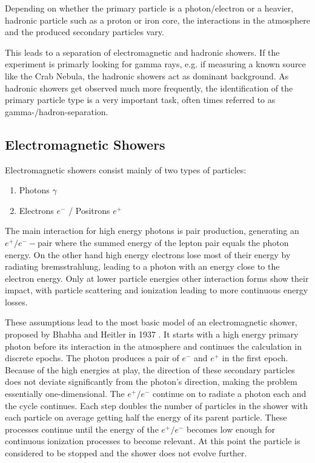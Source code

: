 Depending on whether the primary particle is 
a photon/electron or a heavier, hadronic particle such as a proton 
or iron core, the interactions in the atmosphere and the 
produced secondary particles vary.

This leads to a separation of electromagnetic and hadronic showers.
If the experiment is primarly looking for 
gamma rays, e.g. if measuring a known source like the Crab Nebula, 
the hadronic showers act as dominant background.
As hadronic showers get observed much more frequently, 
the identification of the primary particle type is a very important 
task, often times referred to as gamma-/hadron-separation.

\subsection{Electromagnetic Showers}
Electromagnetic showers consist mainly of two types of particles:
\begin{enumerate}
	\item{Photons $\gamma$}
	\item{Electrons $e^-$ / Positrons $e^+$}
\end{enumerate}

The main interaction for high energy photons is pair 
production, generating an $e^+/e^--$pair where the summed energy of 
the lepton pair equals the photon energy.
On the other hand high energy electrons lose 
most of their energy by radiating bremsstrahlung, leading to a photon with 
an energy close to the electron energy.
Only at lower particle energies other interaction forms show their impact,
with particle scattering and ionization 
leading to more continuous energy losses.

These assumptions lead to the most basic model of an 
electromagnetic shower, proposed by Bhabha and Heitler in 1937
\cite{doi:10.1098/rspa.1937.0082}.
It starts with a high energy primary photon before its interaction in the atmosphere 
and continues the calculation in discrete epochs.
The photon produces a pair of $e^-$ and $e^+$ in the first epoch.
Because of the high energies at play, the direction of these secondary 
particles does not deviate significantly from the photon's direction, 
making the problem essentially one-dimensional.
The $e^+/e^-$ continue on to radiate a photon each and the cycle continues.
Each step doubles the number of particles in the shower with each particle 
on average getting half the energy of its parent particle.
These processes continue until the energy of the $e^+/e^-$ becomes low enough for
continuous ionization processes to become relevant.
At this point the particle is considered to be stopped and the shower
does not evolve further.

